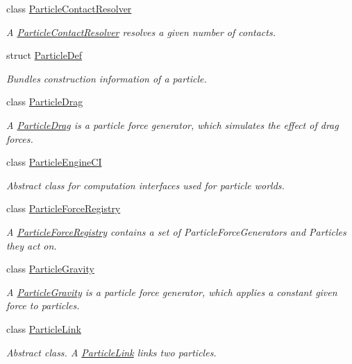 \begin{DoxyCompactItemize}
class \mbox{\hyperlink{classr3_1_1_particle_contact_resolver}{Particle\+Contact\+Resolver}}
\begin{DoxyCompactList}\small\item\em A \mbox{\hyperlink{classr3_1_1_particle_contact_resolver}{Particle\+Contact\+Resolver}} resolves a given number of contacts. \end{DoxyCompactList}\item 
struct \mbox{\hyperlink{structr3_1_1_particle_def}{Particle\+Def}}
\begin{DoxyCompactList}\small\item\em Bundles construction information of a particle. \end{DoxyCompactList}\item 
class \mbox{\hyperlink{classr3_1_1_particle_drag}{Particle\+Drag}}
\begin{DoxyCompactList}\small\item\em A \mbox{\hyperlink{classr3_1_1_particle_drag}{Particle\+Drag}} is a particle force generator, which simulates the effect of drag forces. \end{DoxyCompactList}\item 
class \mbox{\hyperlink{classr3_1_1_particle_engine_c_i}{Particle\+Engine\+CI}}
\begin{DoxyCompactList}\small\item\em Abstract class for computation interfaces used for particle worlds. \end{DoxyCompactList}\item 
class \mbox{\hyperlink{classr3_1_1_particle_force_registry}{Particle\+Force\+Registry}}
\begin{DoxyCompactList}\small\item\em A \mbox{\hyperlink{classr3_1_1_particle_force_registry}{Particle\+Force\+Registry}} contains a set of Particle\+Force\+Generators and Particles they act on. \end{DoxyCompactList}\item 
class \mbox{\hyperlink{classr3_1_1_particle_gravity}{Particle\+Gravity}}
\begin{DoxyCompactList}\small\item\em A \mbox{\hyperlink{classr3_1_1_particle_gravity}{Particle\+Gravity}} is a particle force generator, which applies a constant given force to particles. \end{DoxyCompactList}\item 
class \mbox{\hyperlink{classr3_1_1_particle_link}{Particle\+Link}}
\begin{DoxyCompactList}\small\item\em Abstract class. A \mbox{\hyperlink{classr3_1_1_particle_link}{Particle\+Link}} links two particles. \end{DoxyCompactList}\item 

\end{DoxyCompactItemize}
